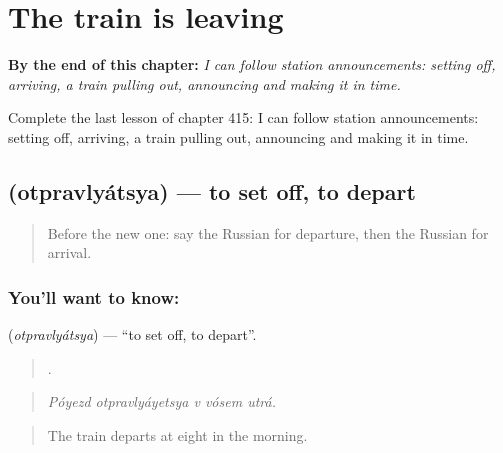 
\chapter{The train is leaving}
\label{ch:ru-the-train-is-leaving}

\begin{chapteropening}
\textbf{By the end of this chapter:} \emph{I can follow station announcements: setting off, arriving, a train pulling out, announcing and making it in time.}

Complete the last lesson of chapter 415: I can follow station announcements: setting off, arriving, a train pulling out, announcing and making it in time.
\end{chapteropening}

\section[\texorpdfstring{\ru{отправляться} (otpravlyátsya)}{отправляться (otpravlyátsya)}]{ (otpravlyátsya) — to set off, to depart}

\label{lesson:RU-C415-otpravlyatsya}



\begin{quote}
Before the new one: say the Russian for departure, then the Russian for arrival.
\end{quote}

\subsection*{You'll want to know: }
\textbf{} (\emph{otpravlyátsya}) — \textquotedblleft{}to set off, to depart\textquotedblright{}.

\begin{quote}
    .
\end{quote}

\begin{quote}
\emph{Póyezd otpravlyáyetsya v vósem utrá.}
\end{quote}

\begin{quote}
The train departs at eight in the morning.
\end{quote}

